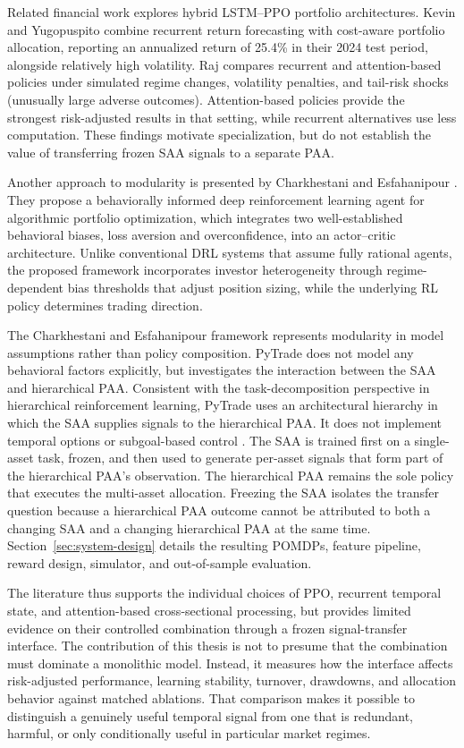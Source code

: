Related financial work explores hybrid LSTM--PPO portfolio architectures. Kevin and Yugopuspito \cite{JunKevin.2025} combine recurrent return forecasting with cost-aware portfolio allocation, reporting an annualized return of 25.4\% in their 2024 test period, alongside relatively high volatility. Raj \cite{GabrielNixonRaj.2025} compares recurrent and attention-based policies under simulated regime changes, volatility penalties, and tail-risk shocks (unusually large adverse outcomes). Attention-based policies provide the strongest risk-adjusted results in that setting, while recurrent alternatives use less computation. These findings motivate specialization, but do not establish the value of transferring frozen SAA signals to a separate PAA.

Another approach to modularity is presented by  Charkhestani and Esfahanipour \cite{Charkestani.2026}. They propose a behaviorally informed deep reinforcement learning agent for algorithmic portfolio optimization, which integrates two well-established behavioral biases, loss aversion and overconfidence, into an actor–critic architecture. Unlike conventional DRL systems that assume fully rational agents, the proposed framework incorporates investor heterogeneity through regime-dependent bias thresholds that adjust position sizing, while the underlying RL policy determines trading direction.

The Charkhestani and Esfahanipour framework represents modularity in model assumptions rather than policy composition. PyTrade does not model any behavioral factors explicitly, but investigates the interaction between the SAA and hierarchical PAA. Consistent with the task-decomposition perspective in hierarchical reinforcement learning, PyTrade uses an architectural hierarchy in which the SAA supplies signals to the hierarchical PAA. It does not implement temporal options or subgoal-based control \cite{Pateria2021}. The SAA is trained first on a single-asset task, frozen, and then used to generate per-asset signals that form part of the hierarchical PAA's observation. The hierarchical PAA remains the sole policy that executes the multi-asset allocation. Freezing the SAA isolates the transfer question because a hierarchical PAA outcome cannot be attributed to both a changing SAA and a changing hierarchical PAA at the same time. Section~\ref{sec:system-design} details the resulting POMDPs, feature pipeline, reward design, simulator, and out-of-sample evaluation.

The literature thus supports the individual choices of PPO, recurrent temporal state, and attention-based cross-sectional processing, but provides limited evidence on their controlled combination through a frozen signal-transfer interface. The contribution of this thesis is not to presume that the combination must dominate a monolithic model. Instead, it measures how the interface affects risk-adjusted performance, learning stability, turnover, drawdowns, and allocation behavior against matched ablations. That comparison makes it possible to distinguish a genuinely useful temporal signal from one that is redundant, harmful, or only conditionally useful in particular market regimes.